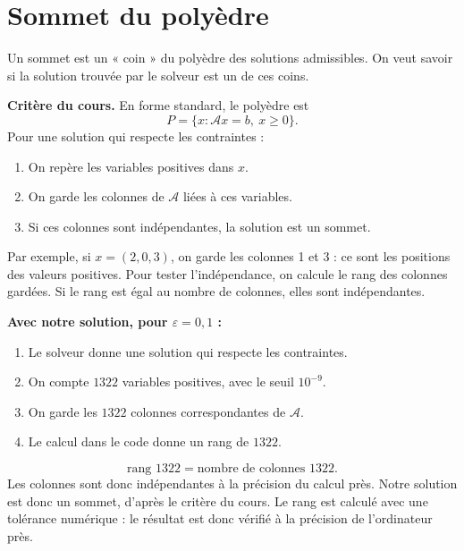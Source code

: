 \documentclass[11pt,a4paper]{article}
\begin{document}
\section{Sommet du polyèdre}
Un sommet est un « coin » du polyèdre des solutions admissibles.
On veut savoir si la solution trouvée par le solveur est un de ces coins.

\textbf{Critère du cours.} En forme standard, le polyèdre est
\[
 P=\{x:\mathcal A x=b,\ x\geq0\}.
\]
Pour une solution qui respecte les contraintes :
\begin{enumerate}
 \item On repère les variables positives dans \(x\).
 \item On garde les colonnes de \(\mathcal A\) liées à ces variables.
 \item Si ces colonnes sont indépendantes, la solution est un sommet.
\end{enumerate}
Par exemple, si \(x=(2,0,3)\), on garde les colonnes 1 et 3 : ce sont
les positions des valeurs positives. Pour tester l'indépendance, on
calcule le rang des colonnes gardées. Si le rang est égal au nombre de
colonnes, elles sont indépendantes.

\textbf{Avec notre solution, pour \(\varepsilon=0{,}1\) :}
\begin{enumerate}
 \item Le solveur donne une solution qui respecte les contraintes.
 \item On compte \(1322\) variables positives, avec le seuil \(10^{-9}\).
 \item On garde les \(1322\) colonnes correspondantes de \(\mathcal A\).
 \item Le calcul dans le code donne un rang de \(1322\).
\end{enumerate}
\[
 \text{rang }1322=\text{nombre de colonnes }1322.
\]
Les colonnes sont donc indépendantes à la précision du calcul près.
Notre solution est donc un sommet, d'après le critère du cours.
Le rang est calculé avec une tolérance numérique : le résultat est
donc vérifié à la précision de l'ordinateur près.
\end{document}
